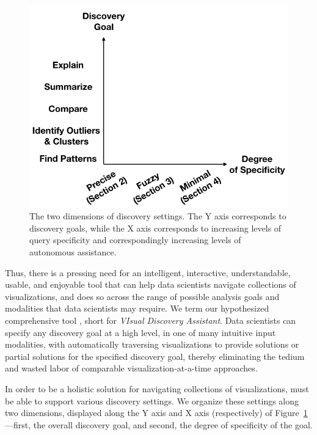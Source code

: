\begin{figure}
\centering
\vspace{-10pt}
\includegraphics[width=\linewidth]{figures/dimensions_cropped.png}
\vspace{-15pt}
\caption{The two dimensions of discovery settings. The Y axis corresponds to discovery goals, while the X axis corresponds to increasing levels of query specificity and correspondingly increasing levels of autonomous assistance.}\label{fig:dimensions}
\vspace{-15pt}
\end{figure}


\par
Thus, there is a pressing need for an 
intelligent,
interactive, understandable, usable, and
enjoyable tool that can help 
data scientists navigate
collections of visualizations,
and does so across the range of possible analysis
goals and modalities that data scientists may 
require.
We term our hypothesized comprehensive tool \vida,
short for {\em VIsual Discovery Assistant}.
Data scientists can specify any discovery
goal at a high level,
in one of many intuitive input modalities,
with \vida 
automatically 
traversing visualizations to provide
solutions or partial solutions for the
specified discovery goal, thereby
eliminating the tedium and wasted
labor of comparable visualization-at-a-time 
approaches.

\par
{} 
In order to be a holistic solution for 
navigating collections of visualizations,
\vida must be able to support various discovery
settings. 
We organize these settings along two
dimensions, displayed along the Y axis and 
X axis (respectively) of Figure~\ref{fig:dimensions}---first, 
the overall discovery goal,
and second, the degree of specificity of the goal.



